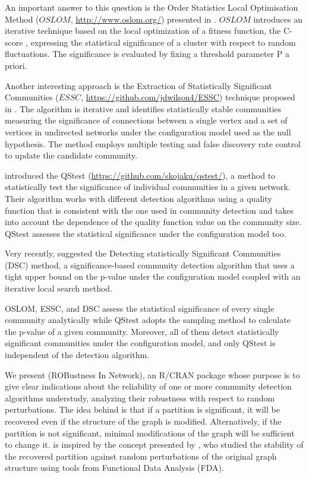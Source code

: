 An important answer to this question is the Order Statistics Local Optimisation Method ($OSLOM$, \url{http://www.oslom.org/}) presented in \cite{Lancichinetti_et_al:2011}. $OSLOM$ introduces an iterative technique based on the local optimization of a fitness function, the C-score \citep{Lancichinetti_et_al:2010}, expressing the statistical significance of a cluster with respect to random fluctuations. The significance is evaluated by fixing a threshold parameter P a priori.

Another interesting approach is the Extraction of Statistically Significant Communities ($ESSC$, \url{https://github.com/jdwilson4/ESSC}) technique proposed in \cite{Wilson_et_al:2014}. The algorithm is iterative and identifies statistically stable communities measuring the significance of connections between a single vertex and a set of vertices in undirected networks under the configuration model \citep{Bender_Canfield:1978} used as the null hypothesis. The method employs multiple testing and false discovery rate control to update the candidate community. 

\cite{Kojaku_Masuda:2018} introduced the QStest (\url{https://github.com/skojaku/qstest/}), a method to statistically test the significance of individual communities in a given network. Their algorithm works with different detection algorithms using a quality function that is consistent with the one used in community detection and takes into account the dependence of the quality function value on the community size. QStest assesses the statistical significance under the configuration model too.

Very recently, \cite{He_et_al:2020} suggested the Detecting statistically Significant Communities (DSC) method, a significance-based community detection algorithm that uses a tight upper bound on the p-value under the configuration model coupled with an iterative local search method.

OSLOM, ESSC, and DSC assess the statistical significance of every single community analytically while QStest adopts the sampling method to calculate the p-value of a given community.
Moreover, all of them detect statistically significant communities under the configuration model, and only QStest is independent of the detection algorithm.

We present  (ROBustness In Network), an R/CRAN package whose purpose is to give clear indications about the reliability of one or more community detection algorithms understudy, analyzing their robustness with respect to random perturbations. The idea behind  is that if a partition is significant, it will be recovered even if the structure of the graph is modified. Alternatively, if the partition is not significant, minimal modifications of the graph will be sufficient to change it.  is inspired by the concept presented by \cite{Carissimo_et_al:2018}, who studied the stability of the recovered partition against random perturbations of the original graph structure using tools from Functional Data Analysis (FDA). 

